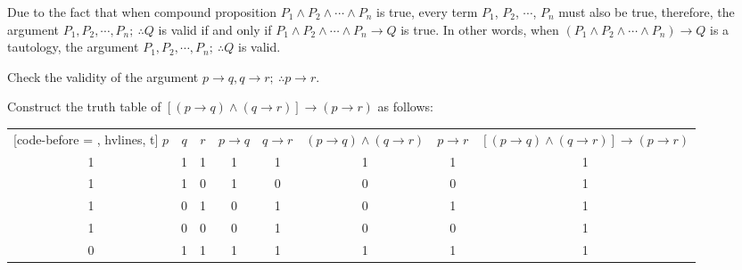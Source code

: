 \documentclass{report}
\newcounter{example}
\begin{document}
Due to the fact that when compound proposition $P_1 \land P_2 \land \cdots
    \land P_n$ is true, every term $P_1$, $P_2$, $\cdots$, $P_n$ must also be true,
therefore, the argument $P_1, P_2, \cdots, P_n;\ \therefore Q$ is valid if and
only if $P_1 \land P_2 \land \cdots \land P_n \rightarrow Q$ is true. In other
words, when $(P_1 \land P_2 \land \cdots \land P_n) \rightarrow Q$ is a
tautology, the argument $P_1, P_2, \cdots, P_n;\ \therefore Q$ is valid.
\vspace{0.5cm}
\begin{example}
    \item Check the validity of the argument $p \rightarrow q, q \rightarrow r;\
        \therefore p \rightarrow r$.
\end{example}
\begin{solution}
    \item Construct the truth table of $[(p \rightarrow q) \land (q \rightarrow r)]
        \rightarrow (p \rightarrow r)$ as follows:
    \begin{center}
        \begin{NiceTabular}{|c|c|c|c|c|c|c|c|}[code-before = , hvlines, t]
            $p$ & $q$ & $r$ & $p \rightarrow q$ & $q \rightarrow r$ & $(p \rightarrow q) \land (q \rightarrow r)$ & $p \rightarrow r$ & $[(p \rightarrow q) \land (q \rightarrow r)] \rightarrow (p \rightarrow r)$ \\
            1   & 1   & 1   & 1                 & 1                 & 1                                           & 1                 & 1                                                                           \\
            1   & 1   & 0   & 1                 & 0                 & 0                                           & 0                 & 1                                                                           \\
            1   & 0   & 1   & 0                 & 1                 & 0                                           & 1                 & 1                                                                           \\
            1   & 0   & 0   & 0                 & 1                 & 0                                           & 0                 & 1                                                                           \\
            0   & 1   & 1   & 1                 & 1                 & 1                                           & 1                 & 1                                                                           \\

\end{NiceTabular}
\end{center}
\end{solution}
\end{document}
